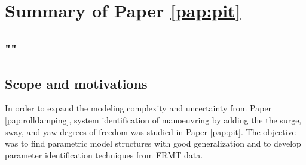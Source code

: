 \section{Summary of Paper \ref{pap:pit}}
\subsection*{""}
\subsection*{Scope and motivations}
In order to expand the modeling complexity and uncertainty from Paper \ref{pap:rolldamping}, system identification of manoeuvring by adding the the surge, sway, and yaw degrees of freedom was studied in Paper \ref{pap:pit}. 
The objective was to find parametric model structures with good generalization and to develop parameter identification techniques from FRMT data.


